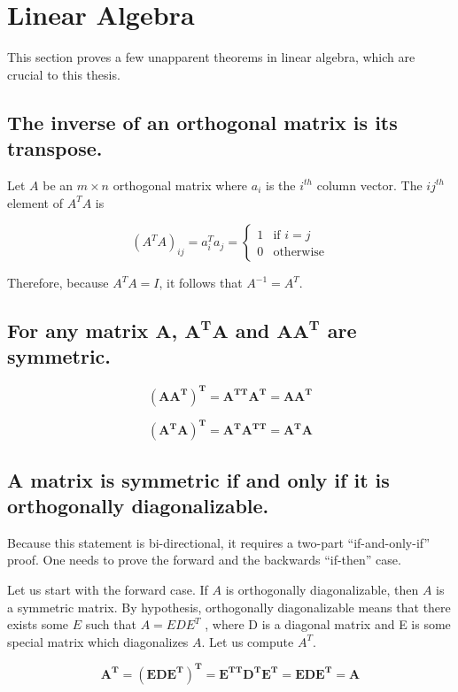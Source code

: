 \documentclass[12pt,notitlepage,oneside]{report}
\begin{document}
\printindex

\appendix

\chapter{Linear Algebra}
	\label{ch:linear}	
This section proves a few unapparent theorems in linear algebra, which are crucial to this thesis.

\section{The inverse of an orthogonal matrix is its transpose.}
Let $A$ be an $m\times n$ orthogonal matrix where $a_i$ is the $i^{th}$ column vector. The $i j^{th}$ element of $A^T A$ is

$$ (A^T A)_{ij} = a_i^T a_j = \begin{cases}
1 & \text{if $i = j$} \\
0 & \text{otherwise} 
\end{cases} $$

Therefore, because $A^T A = I$, it follows that $A^{-1} = A^T$.

\section{For any matrix $\pmb{A}$, $\pmb{A^TA}$ and $\pmb{AA^T}$ are symmetric.}

$$ \pmb{(A A^T)^T = A^{TT}A^T = A A^T} $$

$$\pmb{(A^TA)^T = A^TA^{TT} = A^T A} $$

\section{A matrix is symmetric if and only if it is orthogonally diagonalizable.}
Because this statement is bi-directional, it requires a two-part ``if-and-only-if'' proof. One needs to prove the forward and the backwards ``if-then'' case.

Let us start with the forward case. If $A$ is orthogonally diagonalizable, then $A$ is a symmetric matrix. By hypothesis, orthogonally diagonalizable means that there exists some $E$ such that $A=EDE^T$ , where D is a diagonal matrix and E is some special matrix which diagonalizes $A$. Let us compute $A^T$.

$$ \pmb{A^T = (EDE^T)^T = E^{TT}D^TE^T = EDE^T = A }$$
\end{document}
